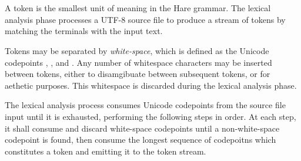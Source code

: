
\begin{grammar}
\\
	 \\
\end{grammar}

\specsubitem
A token is the smallest unit of meaning in the Hare grammar. The lexical
analysis phase processes a UTF-8 source file to produce a stream of tokens by
matching the terminals with the input text.

\specsubitem
Tokens may be separated by \textit{white-space}, which is defined as the
Unicode codepoints , , and . Any number
of whitespace characters may be inserted between tokens, either to disamgibuate
between subsequent tokens, or for aethetic purposes. This whitespace is
discarded during the lexical analysis phase.



\specsubitem
The lexical analysis process consumes Unicode codepoints from the source file
input until it is exhausted, performing the following steps in order. At each
step, it shall consume and discard white-space codepoints until a
non-white-space codepoint is found, then consume the longest sequence of
codepoitns which constitutes a token and emitting it to the token stream.

